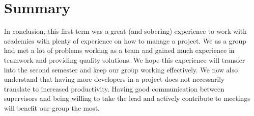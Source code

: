\documentclass[a4paper]{article}
\begin{document}
\section{Summary}
In conclusion, this first term was a great (and sobering) experience to work with academics with plenty of experience on how to manage a project. We as a group had met a lot of problems working as a team and gained much experience in teamwork and providing quality solutions. We hope this experience will transfer into the second semester and keep our group working effectively. We now also understand that having more developers in a project does not necessarily translate to increased productivity. Having good communication between supervisors and being willing to take the lead and actively contribute to meetings will benefit our group the most.


\newpage

\appendix
\end{document}
